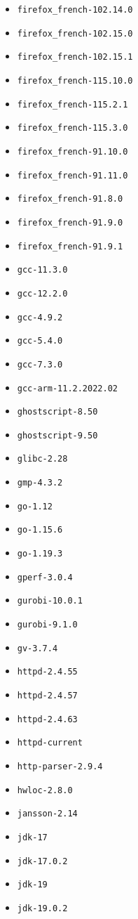 \begin{multicols}{3}
\begin{itemize}
\item \verb|firefox_french-102.14.0|
\item \verb|firefox_french-102.15.0|
\item \verb|firefox_french-102.15.1|
\item \verb|firefox_french-115.10.0|
\item \verb|firefox_french-115.2.1|
\item \verb|firefox_french-115.3.0|
\item \verb|firefox_french-91.10.0|
\item \verb|firefox_french-91.11.0|
\item \verb|firefox_french-91.8.0|
\item \verb|firefox_french-91.9.0|
\item \verb|firefox_french-91.9.1|
\item \verb|gcc-11.3.0|
\item \verb|gcc-12.2.0|
\item \verb|gcc-4.9.2|
\item \verb|gcc-5.4.0|
\item \verb|gcc-7.3.0|
\item \verb|gcc-arm-11.2.2022.02|
\item \verb|ghostscript-8.50|
\item \verb|ghostscript-9.50|
\item \verb|glibc-2.28|
\item \verb|gmp-4.3.2|
\item \verb|go-1.12|
\item \verb|go-1.15.6|
\item \verb|go-1.19.3|
\item \verb|gperf-3.0.4|
\item \verb|gurobi-10.0.1|
\item \verb|gurobi-9.1.0|
\item \verb|gv-3.7.4|
\item \verb|httpd-2.4.55|
\item \verb|httpd-2.4.57|
\item \verb|httpd-2.4.63|
\item \verb|httpd-current|
\item \verb|http-parser-2.9.4|
\item \verb|hwloc-2.8.0|
\item \verb|jansson-2.14|
\item \verb|jdk-17|
\item \verb|jdk-17.0.2|
\item \verb|jdk-19|
\item \verb|jdk-19.0.2|

\end{itemize}
\end{multicols}
